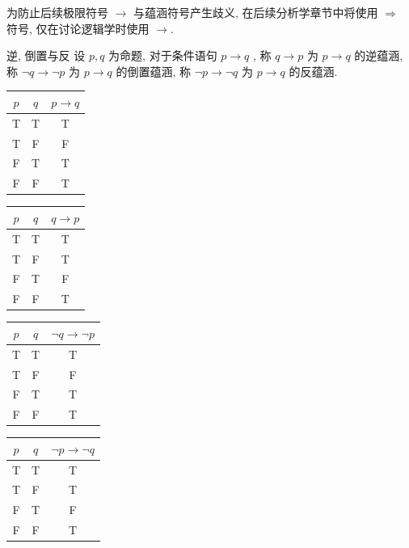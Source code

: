 \documentclass[cn,toc=twocol]{elegantbook}
\begin{document}
\begin{remark}
为防止后续极限符号 $\to$ 与蕴涵符号产生歧义, 在后续分析学章节中将使用 $\Rightarrow$ 符号, 仅在讨论逻辑学时使用 $\rightarrow$.	
\end{remark}

\begin{definition}{逆, 倒置与反}
设 $p, q$ 为命题, 对于条件语句 $p \rightarrow q$ , 称 $q \rightarrow p$ 为 $p \rightarrow q$ 的逆蕴涵, 称 $\neg q \rightarrow \neg p$ 为 $p \rightarrow q$ 的倒置蕴涵, 称 $\neg p \rightarrow \neg q$ 为 $p \rightarrow q$ 的反蕴涵.
\end{definition}

\smallskip

\begin{minipage}[c]{0.25\textwidth}
	\centering
	\begin{tabular}{cc|c}
	$p$ & $q$ & $p\rightarrow q$ \\
	\hline
	T & T & T \\
	T & F & F \\
	F & T & T \\
	F & F & T \\
	\end{tabular}
\end{minipage}
\begin{minipage}[c]{0.25\textwidth}
	\centering
	\begin{tabular}{cc|c}
	$p$ & $q$ & $q \rightarrow p$ \\
	\hline
	T & T & T \\
	T & F & T \\
	F & T & F \\
	F & F & T \\
	\end{tabular}
\end{minipage}
\begin{minipage}[c]{0.25\textwidth}
	\centering
	\begin{tabular}{cc|c}
	$p$ & $q$ & $\neg q \rightarrow \neg p$ \\
	\hline
	T & T & T \\
	T & F & F \\
	F & T & T \\
	F & F & T \\
	\end{tabular}
\end{minipage}
\begin{minipage}[c]{0.25\textwidth}
	\centering
	\begin{tabular}{cc|c}
	$p$ & $q$ & $\neg p \rightarrow \neg q$ \\
	\hline
	T & T & T \\
	T & F & T \\
	F & T & F \\
	F & F & T \\
	\end{tabular}
\end{minipage}
\end{document}
